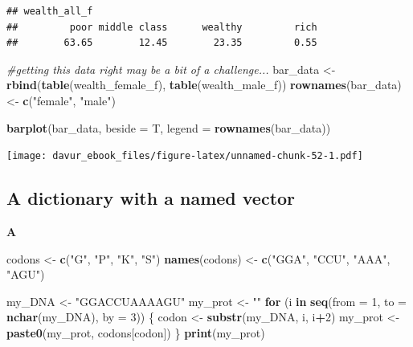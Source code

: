 \documentclass[]{book}
\newenvironment{Shaded}{\begin{snugshade}}{\end{snugshade}}
\newcommand{\CommentTok}[1]{\textcolor[rgb]{0.56,0.35,0.01}{\textit{#1}}}
\newcommand{\ControlFlowTok}[1]{\textcolor[rgb]{0.13,0.29,0.53}{\textbf{#1}}}
\newcommand{\DataTypeTok}[1]{\textcolor[rgb]{0.13,0.29,0.53}{#1}}
\newcommand{\DecValTok}[1]{\textcolor[rgb]{0.00,0.00,0.81}{#1}}
\newcommand{\KeywordTok}[1]{\textcolor[rgb]{0.13,0.29,0.53}{\textbf{#1}}}
\newcommand{\NormalTok}[1]{#1}
\newcommand{\OperatorTok}[1]{\textcolor[rgb]{0.81,0.36,0.00}{\textbf{#1}}}
\newcommand{\StringTok}[1]{\textcolor[rgb]{0.31,0.60,0.02}{#1}}
\begin{document}
\begin{verbatim}
## wealth_all_f
##         poor middle class      wealthy         rich 
##        63.65        12.45        23.35         0.55
\end{verbatim}

\begin{Shaded}
\begin{Highlighting}[]
\CommentTok{#getting this data right may be a bit of a challenge...}
\NormalTok{bar_data <-}\StringTok{ }\KeywordTok{rbind}\NormalTok{(}\KeywordTok{table}\NormalTok{(wealth_female_f), }\KeywordTok{table}\NormalTok{(wealth_male_f))}
\KeywordTok{rownames}\NormalTok{(bar_data) <-}\StringTok{ }\KeywordTok{c}\NormalTok{(}\StringTok{"female"}\NormalTok{, }\StringTok{"male"}\NormalTok{)}

\KeywordTok{barplot}\NormalTok{(bar_data, }\DataTypeTok{beside =}\NormalTok{ T, }\DataTypeTok{legend =} \KeywordTok{rownames}\NormalTok{(bar_data))}
\end{Highlighting}
\end{Shaded}

\texttt{[image: davur\_ebook\_files/figure-latex/unnamed-chunk-52-1.pdf]}

\hypertarget{a-dictionary-with-a-named-vector-1}{%
\subsection{A dictionary with a named vector}\label{a-dictionary-with-a-named-vector-1}}

\textbf{A}

\begin{Shaded}
\begin{Highlighting}[]
\NormalTok{codons <-}\StringTok{ }\KeywordTok{c}\NormalTok{(}\StringTok{"G"}\NormalTok{, }\StringTok{"P"}\NormalTok{, }\StringTok{"K"}\NormalTok{, }\StringTok{"S"}\NormalTok{)}
\KeywordTok{names}\NormalTok{(codons) <-}\StringTok{ }\KeywordTok{c}\NormalTok{(}\StringTok{"GGA"}\NormalTok{, }\StringTok{"CCU"}\NormalTok{, }\StringTok{"AAA"}\NormalTok{, }\StringTok{"AGU"}\NormalTok{)}

\NormalTok{my_DNA <-}\StringTok{ "GGACCUAAAAGU"}
\NormalTok{my_prot <-}\StringTok{ ""}
\ControlFlowTok{for}\NormalTok{ (i }\ControlFlowTok{in} \KeywordTok{seq}\NormalTok{(}\DataTypeTok{from =} \DecValTok{1}\NormalTok{, }\DataTypeTok{to =} \KeywordTok{nchar}\NormalTok{(my_DNA), }\DataTypeTok{by =} \DecValTok{3}\NormalTok{)) \{}
\NormalTok{        codon <-}\StringTok{ }\KeywordTok{substr}\NormalTok{(my_DNA, i, i}\OperatorTok{+}\DecValTok{2}\NormalTok{)}
\NormalTok{        my_prot <-}\StringTok{ }\KeywordTok{paste0}\NormalTok{(my_prot, codons[codon])}
\NormalTok{\}}
\KeywordTok{print}\NormalTok{(my_prot)}
\end{Highlighting}
\end{Shaded}
\end{document}
